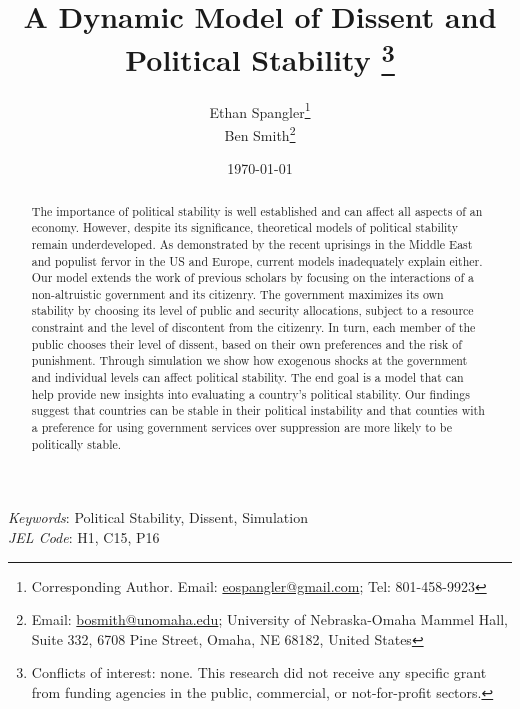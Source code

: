 \documentclass[12pt]{article}
\begin{document}
  


\begin{titlepage}





\title{A Dynamic Model of Dissent and Political Stability \thanks{Conflicts of interest: none. This research did not receive any specific grant from funding agencies in the public, commercial, or not-for-profit sectors.}}

\author{Ethan Spangler\thanks{Corresponding Author. Email: {\href{mailto:eospangler@gmail.com}{eospangler@gmail.com}}; Tel: 801-458-9923}\\%
Ben Smith\thanks{Email: {\href{mailto:bosmith@unomaha.edu}{bosmith@unomaha.edu}}; University of Nebraska-Omaha Mammel Hall, Suite 332, 6708 Pine Street, Omaha, NE 68182, United States}}


\date{\today}
\maketitle


\begin{abstract}
\noindent The importance of political stability is well established and can affect all aspects of an economy. However, despite its significance, theoretical models of political stability remain underdeveloped. As demonstrated by the recent uprisings in the Middle East and populist fervor in the US and Europe, current models inadequately explain either. Our model extends the work of previous scholars by focusing on the interactions of a non-altruistic government and its citizenry. The government maximizes its own stability by choosing its level of public and security allocations, subject to a resource constraint and the level of discontent from the citizenry. In turn, each member of the public chooses their level of dissent, based on their own preferences and the risk of punishment. Through simulation we show how exogenous shocks at the government and individual levels can affect political stability. The end goal is a model that can help provide new insights into evaluating a country's political stability. Our findings suggest that countries can be stable in their political instability and that counties with a preference for using government services over suppression are more likely to be politically stable.      


\end{abstract}

\noindent \textit{Keywords}: Political Stability, Dissent, Simulation \\

\noindent \textit{JEL Code}: H1, C15, P16


\end{titlepage}
\end{document}
